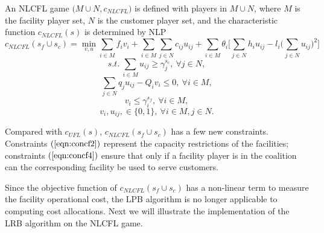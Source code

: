 \documentclass[ijoc,nonblindrev]{informs3} %
\begin{document}
\begin{definition}
An NLCFL game $\big( M \cup N,c_{NLCFL} \big)$ is defined with players in $M \cup N$, where $M$ is the facility player set, $N$  is the customer player set, and the characteristic function $c_{NLCFL}(s)$ is determined by NLP
\begin{equation}\label{eqn:cfobjnonlinear}
c_{NLCFL}(s_f \cup s_c) = \min_{v,u}  \sum_{i \in M} f_iv_i + \sum_{i \in M}\sum_{j \in N} c_{ij}u_{ij} + \sum_{i \in M} \theta_i \big[ \sum_{j \in N}h_iu_{ij} - l_i \big(\sum_{j \in N}u_{ij}\big)^2 \big]
\end{equation}
\begin{equation}\label{eqn:concf1}
s.t.~\sum_{i \in M} u_{ij} \geq \gamma_j^{s_c},~\forall j \in N,
\end{equation}
\begin{equation}\label{eqn:concf2}
\sum_{j \in N}q_ju_{ij} - Q_iv_i \leq 0, ~\forall i \in M,
\end{equation}
\begin{equation}\label{eqn:concf4}
v_i \leq \gamma_i^{s_f},~\forall i \in M,
\end{equation}
\begin{equation}\label{eqn:concf7}
 v_i,u_{ij}, \in \big\{0,1\big\},~\forall i \in M, j \in N.
\end{equation}
\end{definition}
Compared with $c_{UFL}(s)$, $c_{NLCFL}(s_f \cup s_c)$ has a few new constraints.
Constraints $(\ref{eqn:concf2})$ represent the capacity restrictions of the facilities; constraints $(\ref{eqn:concf4})$ ensure that only if a facility player is in the coalition can the corresponding facility be used to serve customers.


Since the objective function of $c_{NLCFL}(s_f \cup s_c)$ has a non-linear term to measure the facility operational cost, the LPB algorithm is no longer applicable to computing cost allocations. Next we will illustrate the implementation of the LRB algorithm on the NLCFL game.
\end{document}
